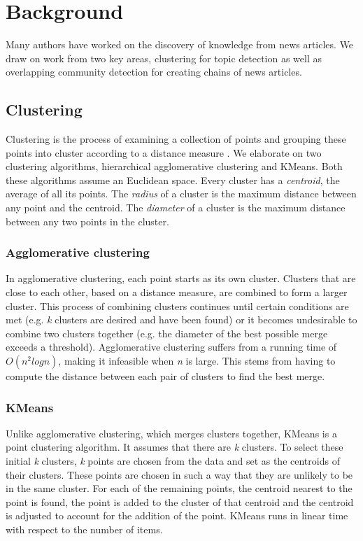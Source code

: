 \documentclass[12pt]{article}
\begin{document}
\section{Background}
Many authors have worked on the discovery of knowledge from news articles. We draw on work from two key areas, clustering for topic detection as well as overlapping community detection for creating chains of news articles.

\subsection{Clustering}
Clustering is the process of examining a collection of points and grouping these points into cluster according to a distance measure \cite{mining2012}. We elaborate on two clustering algorithms, hierarchical agglomerative clustering and KMeans. Both these algorithms assume an Euclidean space. Every cluster has a \textit{centroid}, the average of all its points. The \textit{radius} of a cluster is the maximum distance between any point and the centroid. The \textit{diameter} of a cluster is the maximum distance between any two points in the cluster.

\subsubsection{Agglomerative clustering}
In agglomerative clustering, each point starts as its own cluster. Clusters that are close to each other, based on a distance measure, are combined to form a larger cluster. This process of combining clusters continues until certain conditions are met (e.g. \textit{k} clusters are desired and have been found) or it becomes undesirable to combine two clusters together (e.g. the diameter of the best possible merge exceeds a threshold). Agglomerative clustering suffers from a running time of $O(n^2 log n)$, making it infeasible when \textit{n} is large. This stems from having to compute the distance between each pair of clusters to find the best merge.

\subsubsection{KMeans}
Unlike agglomerative clustering, which merges clusters together, KMeans is a point clustering algorithm. It assumes that there are \textit{k} clusters. To select these initial \textit{k} clusters, \textit{k} points are chosen from the data and set as the centroids of their clusters. These points are chosen in such a way that they are unlikely to be in the same cluster. For each of the remaining points, the centroid nearest to the point is found, the point is added to the cluster of that centroid and the centroid is adjusted to account for the addition of the point. KMeans runs in linear time with respect to the number of items.
\end{document}
